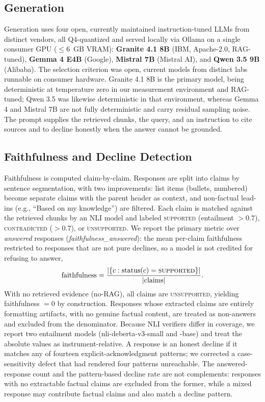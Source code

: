 \documentclass[conference]{IEEEtran}
\begin{document}
\subsection{Generation}
Generation uses four open, currently maintained instruction-tuned LLMs from distinct vendors, all Q4-quantized and served locally via Ollama on a single consumer GPU ($\leq$6~GB VRAM): \textbf{Granite 4.1 8B} (IBM, Apache-2.0, RAG-tuned), \textbf{Gemma 4 E4B} (Google), \textbf{Mistral 7B} (Mistral AI), and \textbf{Qwen 3.5 9B} (Alibaba). The selection criterion was open, current models from distinct labs runnable on consumer hardware. Granite 4.1 8B is the primary model, being deterministic at temperature zero in our measurement environment and RAG-tuned; Qwen 3.5 was likewise deterministic in that environment, whereas Gemma 4 and Mistral 7B are not fully deterministic and carry residual sampling noise. The prompt supplies the retrieved chunks, the query, and an instruction to cite sources and to decline honestly when the answer cannot be grounded.
\subsection{Faithfulness and Decline Detection}
Faithfulness is computed claim-by-claim. Responses are split into claims by sentence segmentation, with two improvements: list items (bullets, numbered) become separate claims with the parent header as context, and non-factual lead-ins (e.g., ``Based on my knowledge'') are filtered. Each claim is matched against the retrieved chunks by an NLI model and labeled \textsc{supported} (entailment $>0.7$), \textsc{contradicted} ($>0.7$), or \textsc{unsupported}. We report the primary metric over \emph{answered} responses (\textit{faithfulness\_answered}): the mean per-claim faithfulness restricted to responses that are not pure declines, so a model is not credited for refusing to answer,
\begin{equation}
\text{faithfulness} = \frac{|\{c : \text{status}(c) = \textsc{supported}\}|}{|\text{claims}|}.
\label{eq:faith}
\end{equation}
With no retrieved evidence (no-RAG), all claims are \textsc{unsupported}, yielding faithfulness $=0$ by construction. Responses whose extracted claims are entirely formatting artifacts, with no genuine factual content, are treated as non-answers and excluded from the denominator. Because NLI verifiers differ in coverage, we report two entailment models (nli-deberta-v3-small and -base) and treat the absolute values as instrument-relative. A response is an honest decline if it matches any of fourteen explicit-acknowledgment patterns; we corrected a case-sensitivity defect that had rendered four patterns unreachable. The answered-response count and the pattern-based decline rate are not complements: responses with no extractable factual claims are excluded from the former, while a mixed response may contribute factual claims and also match a decline pattern.
\end{document}
